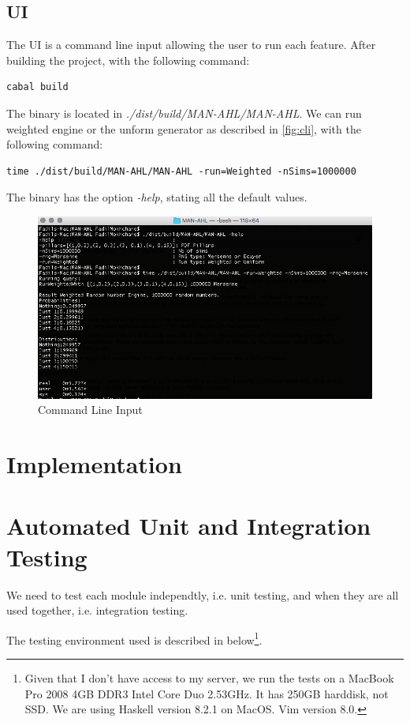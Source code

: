 \documentclass[12pt,a4paper,article]{memoir} %
\begin{document}
\subsection{UI}
The UI is a command line input allowing the user to run each feature.
After building the project, with the following command:
\begin{verbatim}
cabal build
\end{verbatim}
The binary is located in \emph{./dist/build/MAN-AHL/MAN-AHL}.
We can run weighted engine or the unform generator
 as described in \autoref{fig:cli}, with the following command:
\begin{verbatim}
time ./dist/build/MAN-AHL/MAN-AHL -run=Weighted -nSims=1000000
\end{verbatim}
 The binary has the option \emph{-help}, stating all the default values.
\begin{figure}[h!]
\begin{center}
\includegraphics[width=1\textwidth]{img/cli.png}
\caption{Command Line Input}
\label{fig:cli}
\end{center}
\end{figure}


\section{Implementation}


\section{Automated Unit and Integration Testing}
We need to test each module independtly, i.e. unit testing, and when they 
are all used together, i.e. integration testing.

The testing environment used is described in below\footnote{
Given that I don't have access to my server, 
we run the tests on a MacBook Pro 2008 4GB DDR3 Intel Core Duo 2.53GHz.
It has 250GB harddisk, not SSD. 
We are using Haskell version 8.2.1 on MacOS. Vim version 8.0.
}.
\end{document}

